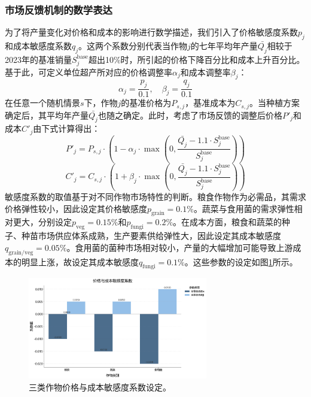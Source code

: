 \subsubsection{市场反馈机制的数学表达}
为了将产量变化对价格和成本的影响进行数学描述，我们引入了价格敏感度系数$p_j$和成本敏感度系数$q_j$。这两个系数分别代表当作物$j$的七年平均年产量$\bar{Q_j}$相较于2023年的基准销量$S_j^{\text{base}}$超出10\%时，所引起的价格下降百分比和成本上升百分比。基于此，可定义单位超产所对应的价格调整率$\alpha_j$和成本调整率$\beta_j$：
\begin{equation}
\alpha_j = \frac{p_j}{0.1}, \quad \beta_j = \frac{q_j}{0.1}
\end{equation}
在任意一个随机情景$s$下，作物$j$的基准价格为$P_{s,j}$，基准成本为$C_{s,j}$。当种植方案确定后，其平均年产量$\bar{Q_j}$也随之确定。此时，考虑了市场反馈的调整后价格$P'_{j}$和成本$C'_{j}$由下式计算得出：
\begin{equation}
P'_{j} = P_{s,j} \cdot \left(1 - \alpha_j \cdot \max\left(0, \frac{\bar{Q_j} - 1.1 \cdot S_j^{\text{base}}}{S_j^{\text{base}}}\right)\right)
\end{equation}
\begin{equation}
C'_{j} = C_{s,j} \cdot \left(1 + \beta_j \cdot \max\left(0, \frac{\bar{Q_j} - 1.1 \cdot S_j^{\text{base}}}{S_j^{\text{base}}}\right)\right)
\end{equation}
敏感度系数的取值基于对不同作物市场特性的判断。粮食作物作为必需品，其需求价格弹性较小，因此设定其价格敏感度$p_{\text{grain}}=0.1\%$。蔬菜与食用菌的需求弹性相对更大，分别设定$p_{\text{veg}}=0.15\%$和$p_{\text{fungi}}=0.2\%$。在成本方面，粮食和蔬菜的种子、种苗市场供应体系成熟，生产要素供给弹性大，因此设定其成本敏感度$q_{\text{grain/veg}}=0.05\%$。食用菌的菌种市场相对较小，产量的大幅增加可能导致上游成本的明显上涨，故设定其成本敏感度$q_{\text{fungi}}=0.1\%$。这些参数的设定如图\ref{fig:sensitivity_setup}所示。

\begin{figure}[H]
    \centering
    \includegraphics[width=0.7\textwidth]{figs/5问题三/敏感度系数设定图.png}
    \caption{三类作物价格与成本敏感度系数设定。}
    \label{fig:sensitivity_setup}
\end{figure}

